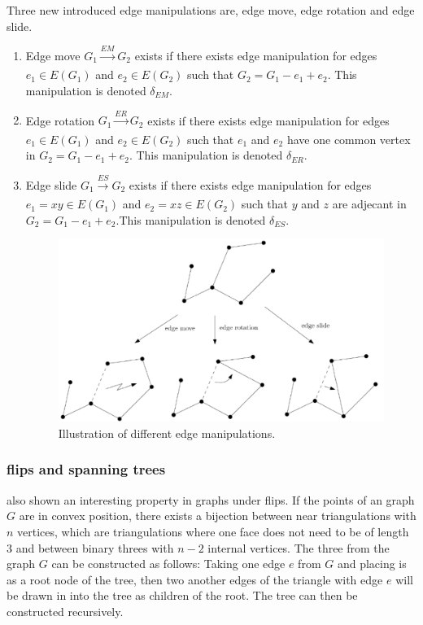 Three new introduced edge manipulations are, edge move, edge rotation and edge slide. 
\begin{enumerate}
    \item Edge move $G_1 \xrightarrow[]{EM} G_2$ exists if there exists edge manipulation for edges $e_1 \in E(G_1)$ and $e_2 \in E(G_2)$ such that $G_2 = G_1 - e_1 + e_2$. This manipulation is denoted $\delta_{EM}$.
    
    \item Edge rotation $G_1 \xrightarrow[]{ER} G_2$ exists if there exists edge manipulation for edges  $e_1 \in E(G_1)$ and $e_2 \in E(G_2)$ such that $e_1$ and $e_2$ have one common vertex in $G_2 = G_1 - e_1 + e_2$. This manipulation is denoted $\delta_{ER}$.
    
    \item Edge slide $G_1 \xrightarrow[]{ES} G_2$  exists if there exists edge manipulation for edges $e_1 = xy \in E(G_1)$ and $e_2 = xz \in E(G_2)$ such that $y$ and $z$ are adjecant in $G_2 = G_1 - e_1 + 
    e_2$.This manipulation is denoted $\delta_{ES}$.
    
    \begin{figure}[H]
    \includegraphics[width=\textwidth]{images/edgeManipulation.PNG}
    \caption{Illustration of different edge manipulations\parencite{bose2009flips}.}
    \end{figure}
    
\end{enumerate}

\subsubsection{flips and spanning trees}

\textcite{LEE1989551} also shown an interesting property in graphs under flips. If the points of an graph $G$ are in convex position, there exists a bijection between near triangulations with $n$ vertices, which are triangulations where one face does not need to be of length 3 and between binary threes with $n - 2$ internal vertices. The three from the graph $G$ can be constructed as follows: Taking one edge $e$ from $G$ and placing is as a root node of the tree, then two another edges of the triangle with edge $e$ will be drawn in into the tree as children of the root. The tree can then be constructed recursively. 


